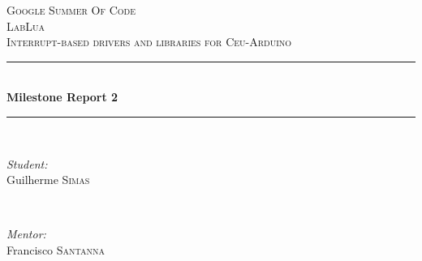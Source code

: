 \documentclass{article}
\begin{document}
\begin{titlepage}

\newcommand{\HRule}{\rule{\linewidth}{0.5mm}} %

\center %
 

\textsc{\LARGE Google Summer Of Code}\\[1.5cm] %
\textsc{\Large LabLua}\\[0.5cm] %
\textsc{\large Interrupt-based drivers and libraries for Ceu-Arduino}\\[0.5cm] %


\HRule \\[0.4cm]
{ \huge \bfseries Milestone Report 2}\\[0.4cm] %
\HRule \\[1.5cm]
 

\begin{minipage}{0.4\textwidth}
\begin{flushleft} \large
\emph{Student:}\\
Guilherme \textsc{Simas} %
\end{flushleft}
\end{minipage}
~
\begin{minipage}{0.4\textwidth}
\begin{flushright} \large
\emph{Mentor:} \\
Francisco \textsc{Santanna} %
\end{flushright}
\end{minipage}\\[4cm]



\end{titlepage}
\end{document}
